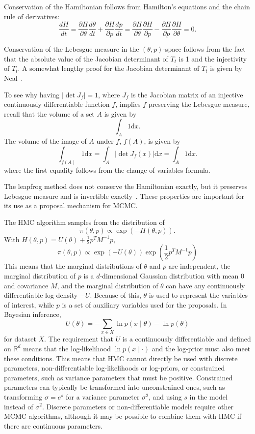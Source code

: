 \documentclass[english,twoside,openright]{HYgraduMLDS}
\newcommand{\R}{\mathbb{R}}
\newcommand{\dx}{\mathrm{d}}
\begin{document}
Conservation of the Hamiltonian follows from Hamilton's equations and the 
chain rule of derivatives:
\[
    \frac{dH}{dt} = \frac{\partial H}{\partial \theta}\frac{d \theta}{dt}
    + \frac{\partial H}{\partial p}\frac{dp}{dt}
    = \frac{\partial H}{\partial \theta}\frac{\partial H}{\partial p}
    - \frac{\partial H}{\partial p}\frac{\partial H}{\partial \theta}
    = 0.
\]

Conservation of the Lebesgue measure in the \((\theta, p)\)-space follows
from the fact that 
the absolute value of the Jacobian determinant of \(T_t\) is 1 and the 
injectivity of \(T_t\). A somewhat 
lengthy proof for the Jacobian determinant of \(T_t\) is given by
Neal~\cite{neal2012mcmc}. 

To see why 
having \(|\det J_f| = 1\), where \(J_f\) is the Jacobian matrix of an injective 
continuously differentiable function \(f\), 
implies \(f\) preserving the Lebesgue measure, recall that the volume of a set
\(A\) is given by 
\[
    \int_A 1\dx x.
\]
The volume of the image of \(A\) under \(f\), \(f(A)\), is given by
\[
    \int_{f(A)}1\dx x = \int_{A}|\det J_f(x)|\dx x = \int_A 1\dx x.
\]
where the first equality follows from the change of variables formula.

The leapfrog method does not conserve the Hamiltonian exactly, but it 
preserves Lebesgue measure and is invertible exactly~\cite{neal2012mcmc}.
These properties are important for its use as a proposal mechanism for MCMC.

The HMC algorithm samples from the distribution of~\cite{neal2012mcmc}
\[
    \pi(\theta, p) \propto \exp(-H(\theta, p)).
\]
With \(H(\theta, p) = U(\theta) + \frac{1}{2}p^{T}M^{-1}p\),
\[
    \pi(\theta, p) \propto \exp(-U(\theta))\exp\left(\frac{1}{2}p^{T}M^{-1}p\right)
\]
This means that the marginal distributions of \(\theta\) and \(p\) are 
independent, the marginal distribution of \(p\) is a \(d\)-dimensional
Gaussian distribution 
with mean 0 and covariance \(M\), and the marginal distribution of
\(\theta\) can have any continuously differentiable log-density \(-U\).
Because of this, \(\theta\) is used to represent the variables of interest,
while \(p\) is a set of auxiliary variables used for the proposals.
In Bayesian inference,
\[
  U(\theta) = -\sum_{x\in X}\ln p(x\mid \theta) - \ln p(\theta)
\]
for dataset \(X\). The requirement that \(U\) is a continuously differentiable
and defined on \(\R^{d}\) means that the log-likelihood \(\ln p(x\mid \cdot)\)
and the log-prior must also meet these conditions. This means that HMC cannot directly
be used with discrete parameters, non-differentiable log-likelihoods or log-priors,
or constrained parameters, such as variance
parameters that must be positive. Constrained parameters can typically be
transformed into unconstrained ones, such as transforming \(\sigma = e^{s}\)
for a variance parameter \(\sigma^{2}\), and using \(s\) in the model instead
of \(\sigma^{2}\). Discrete parameters or non-differentiable models
require other MCMC algorithms, although it may be possible to combine them
with HMC if there are continuous parameters.
\end{document}
